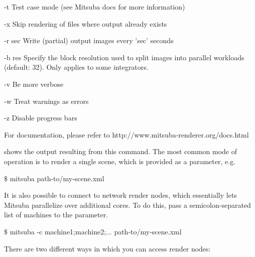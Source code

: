 \begin{console}[label=lst:mitsuba-cli,caption=Command line options of the \texttt{mitsuba} binary]
   -t          Test case mode (see Mitsuba docs for more information)

   -x          Skip rendering of files where output already exists

   -r sec      Write (partial) output images every 'sec' seconds

   -b res      Specify the block resolution used to split images into parallel
               workloads (default: 32). Only applies to some integrators.

   -v          Be more verbose

   -w          Treat warnings as errors

   -z          Disable progress bars

 For documentation, please refer to http://www.mitsuba-renderer.org/docs.html
\end{console}
 shows the output resulting from this command. The most common
mode of operation is to render a single scene, which is provided as a parameter, e.g.
\begin{shell}
$\texttt{\$}$ mitsuba path-to/my-scene.xml
\end{shell}
It is also possible to connect to network render nodes, which essentially lets Mitsuba parallelize
over additional cores. To do this, pass a semicolon-separated list of machines to 
the  parameter. 
\begin{shell}
$\texttt{\$}$ mitsuba -c machine1;machine2;... path-to/my-scene.xml
\end{shell}
There are two different ways in which you can access render nodes:
